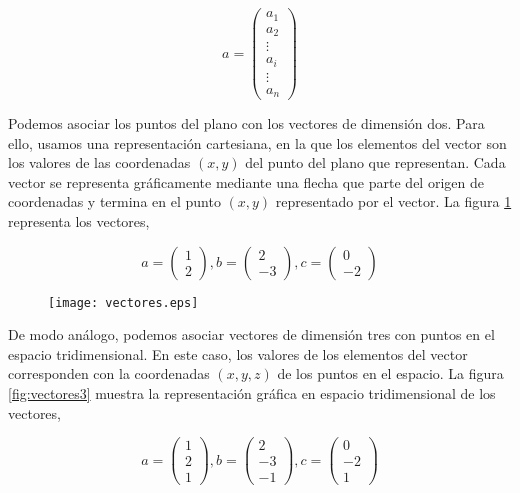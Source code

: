 \begin{equation*}
a=
\begin{pmatrix}
a_1\\
a_2\\
\vdots \\
a_i\\
\vdots \\
a_n
\end{pmatrix}
\end{equation*}
\begin{paracol}{2}
Podemos asociar los puntos del plano con los vectores de dimensión dos. Para ello, usamos una representación cartesiana, en la que los elementos del vector son los valores de las coordenadas $(x,y)$ del punto del plano que representan. Cada vector se representa gráficamente mediante una flecha que parte del origen de coordenadas y termina en el punto $(x,y)$ representado por el vector. La figura \ref{fig:vectores} representa los vectores,
\end{paracol}
\begin{equation*}
a=
\begin{pmatrix}
1\\
2
\end{pmatrix},
b=
\begin{pmatrix}
2\\
-3
\end{pmatrix},
c=
\begin{pmatrix}
0\\
-2
\end{pmatrix}
\end{equation*}


\begin{figure}[h]
\centering
\texttt{[image: vectores.eps]}
\label{fig:vectores}
\end{figure}

\begin{paracol}{2}
De modo análogo, podemos asociar vectores de dimensión tres con puntos en el espacio tridimensional. En este caso, los valores de los elementos del vector corresponden con la coordenadas $(x,y,z)$ de los puntos en el espacio. La figura \ref{fig:vectores3} muestra la representación gráfica en espacio tridimensional de los vectores,
\end{paracol}
\begin{equation*}
a=
\begin{pmatrix}
1\\
2\\
1
\end{pmatrix},
b=
\begin{pmatrix}
2\\
-3\\
-1
\end{pmatrix},
c=
\begin{pmatrix}
0\\
-2\\
1
\end{pmatrix}
\end{equation*}

